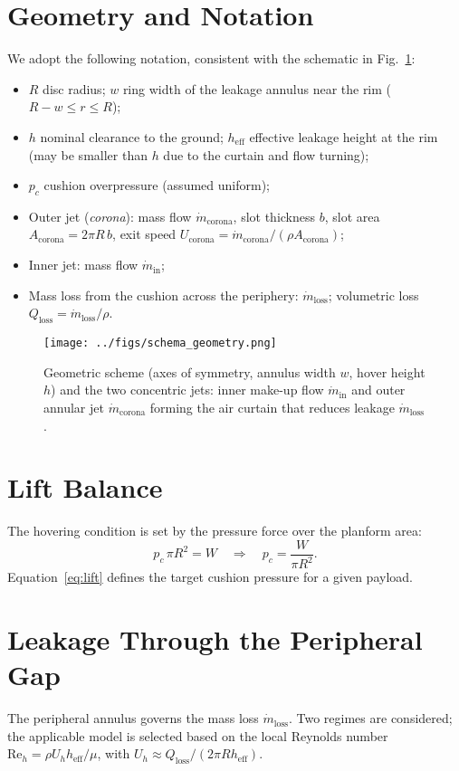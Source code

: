 \documentclass[11pt,a4paper]{article}
\begin{document}
\section{Geometry and Notation}
We adopt the following notation, consistent with the schematic in Fig.~\ref{fig:geometry}:
\begin{itemize}
  \item $R$ disc radius; $w$ ring width of the leakage annulus near the rim ($R-w\le r\le R$);
  \item $h$ nominal clearance to the ground; $h_{\mathrm{eff}}$ effective leakage height at the rim (may be smaller than $h$ due to the curtain and flow turning);
  \item $p_c$ cushion overpressure (assumed uniform);
  \item Outer jet (\textit{corona}): mass flow $\dot m_{\mathrm{corona}}$, slot thickness $b$, slot area $A_{\mathrm{corona}}=2\pi R\,b$, exit speed $U_{\mathrm{corona}}=\dot m_{\mathrm{corona}}/(\rho A_{\mathrm{corona}})$;
  \item Inner jet: mass flow $\dot m_{\mathrm{in}}$;
  \item Mass loss from the cushion across the periphery: $\dot m_{\mathrm{loss}}$; volumetric loss $Q_{\mathrm{loss}}=\dot m_{\mathrm{loss}}/\rho$.
\end{itemize}
\begin{figure}[t]
  \centering
  \texttt{[image: ../figs/schema\_geometry.png]}
  \caption{Geometric scheme (axes of symmetry, annulus width $w$, hover height $h$) and the two concentric jets: inner make-up flow $\dot m_{\mathrm{in}}$ and outer annular jet $\dot m_{\mathrm{corona}}$ forming the air curtain that reduces leakage $\dot m_{\mathrm{loss}}$.}
  \label{fig:geometry}
\end{figure}

\section{Lift Balance}
The hovering condition is set by the pressure force over the planform area:
\begin{equation}
  p_c\,\pi R^2 = W
  \quad \Rightarrow \quad
  p_c = \frac{W}{\pi R^2}.
  \label{eq:lift}
\end{equation}
Equation~\eqref{eq:lift} defines the target cushion pressure for a given payload.

\section{Leakage Through the Peripheral Gap}
The peripheral annulus governs the mass loss $\dot m_{\mathrm{loss}}$. Two regimes are considered; the applicable model is selected based on the local Reynolds number $\mathrm{Re}_h=\rho U_h h_{\mathrm{eff}}/\mu$, with $U_h\approx Q_{\mathrm{loss}}/(2\pi R h_{\mathrm{eff}})$.
\end{document}
